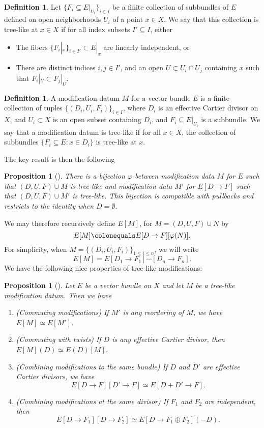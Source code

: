 \documentclass[11pt]{amsart}
\newtheorem{prop}[thm]{Proposition}
\newcommand{\defi}[1]{\textsf{#1}}
\theoremstyle{definition}
\newtheorem{defin}[thm]{Definition}
\theoremstyle{remark}
\begin{document}
\begin{defin}
Let $\{F_i \subseteq E|_{U_i}\}_{i \in I}$ be a finite collection of subbundles of $E$ defined on open neighborhoods $U_i$ of a point $x \in X$.
We say that this collection is \defi{tree-like at $x \in X$} if for all index subsets $I' \subseteq I$, either
\begin{itemize}
\item The fibers $\{F_i|_x \}_{i \in I'} \subset E|_x$ are linearly independent, or
\item There are distinct indices $i, j \in I'$, and an open $U \subset U_i \cap U_j$ containing $x$ such that $F_i|_U \subset F_j|_U$.
\end{itemize}
\end{defin}

\begin{defin}
A \defi{modification datum} $M$ for a vector bundle $E$ is a finite collection of tuples $\{(D_i, U_i, F_i)\}_{i \in I}$, where $D_i$ is an effective Cartier divisor on $X$, and $U_i \subset X$ is an open subset containing $D_i$, and $F_i \subseteq E|_{U_i}$ is a subbundle.  We say that a modification datum is \defi{tree-like} if for all $x \in X$, the collection of subbundles $\{F_i \subseteq E : x \in D_i\}$ is tree-like at $x$.
\end{defin}

The key result is then the following

\begin{prop}[{\cite[Proposition 2.17]{joint}}]\label{transfer}
There is a bijection $\varphi$ between modification data $M$ for $E$ such that $(D, U, F) \cup M$ is tree-like and modification data $M'$ for $E[D \to F]$ such that $(D, U, F) \cup M'$ is tree-like.  This bijection is compatible with pullbacks and restricts to the identity when $D = \emptyset$.  
\end{prop}
We may therefore recursively define $E[M]$, for $M = (D, U, F) \cup N$ by
\[E[M] \colonequals E[D \to F][\varphi(N)]. \]
For simplicity, when $M = \{(D_i, U_i, F_i)\}_{1 \leq i \leq n} $, we will write 
\[E[M] = E[D_1\to F_1] \cdots [D_n \to F_n]. \]
We have the following nice properties of tree-like modifications:

\begin{prop}[{\cite[Propositions 2.20, 2.21, 2.23]{joint}}] \label{mod-prop}
Let $E$ be a vector bundle on $X$ and let $M$ be a tree-like modification datum.  Then we have
\begin{enumerate}
\item (Commuting modifications) If $M'$ is any reordering of $M$, we have $E[M] \simeq E[M']$.
\item (Commuting with twists) If $D$ is any effective Cartier divisor, then $E[M](D) \simeq E(D)[M]$.
\item (Combining modifications to the same bundle) If $D$ and $D'$ are effective
Cartier divisors, we have
\[E[D \to F][D' \to F] \simeq E[D + D' \to F]. \]
\item (Combining modifications at the same divisor) If $F_1$ and $F_2$ are independent, then
\[E[D \to F_1][D \to F_2] \simeq E[D \to F_1 \oplus F_2](-D). \]
\end{enumerate}
\end{prop}
\end{document}
